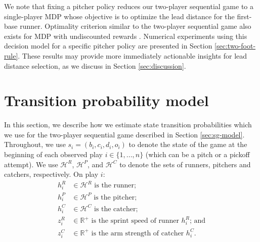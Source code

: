 \documentclass[11pt]{article}
\begin{document}
    We note that fixing a pitcher policy reduces our two-player sequential game to a single-player MDP whose objective is to optimize the lead distance for the first-base runner. Optimality criterion similar to the two-player sequential game also exists for MDP with undiscounted rewards \parencite[Section 7.2]{bertsekas_dynamic_2012}. Numerical experiments using this decision  model for a specific pitcher policy are presented in Section \ref{sec:two-foot-rule}. These results may provide more immediately actionable insights for lead distance selection, as we discuss in Section \ref{sec:discussion}.

  \section{Transition probability model}
  \label{sec:transition-probability-model}

    In this section, we describe how we estimate state transition probabilities which we use for the two-player sequential game described in Section \ref{sec:sg-model}. Throughout, we use $s_i = (b_i, c_i, d_i, o_i)$ to denote the state of the game at the beginning of each observed play $i \in \{1, ..., n\}$ (which can be a pitch or a pickoff attempt). We use $\mathcal{H}^R$, $\mathcal{H}^P$, and $\mathcal{H}^C$ to denote the sets of runners, pitchers and catchers, respectively. On play $i$:
    \begin{align*}
      h_i^R & \in \mathcal{H}^R \mbox{ is the runner;}\\
      h_i^P & \in \mathcal{H}^P \mbox{ is the pitcher;}\\
      h_i^C & \in \mathcal{H}^C \mbox{ is the catcher;}\\
      z_i^R & \in \mathbb{R^+} \mbox{ is the sprint speed of runner $h_i^R$; and}\\
      z_i^C & \in \mathbb{R^+} \mbox{ is the arm strength of catcher $h_i^C$.}
    \end{align*}
    
\end{document}
